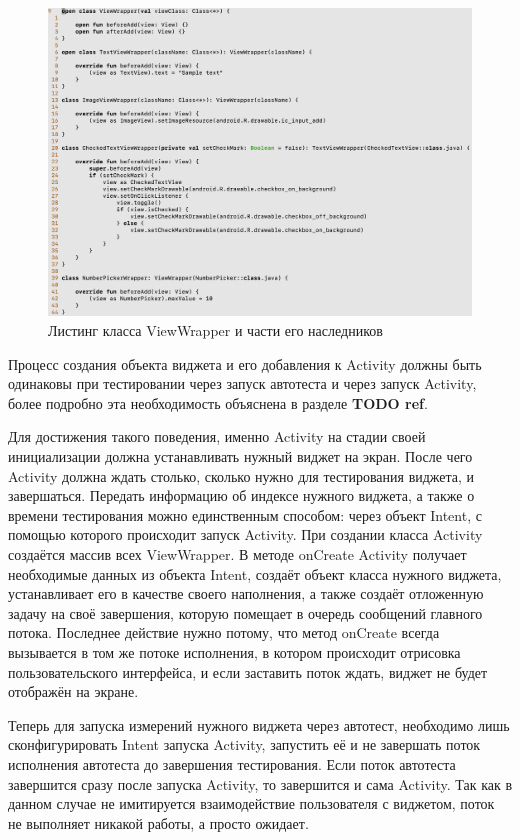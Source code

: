 \documentclass[a4paper,14pt]{extarticle} %
\begin{document}
	\begin{figure}[tbh]
		\includegraphics[width=\textwidth]{wrapper}
		\caption{Листинг класса ViewWrapper и части его наследников}
		\label{fig:wrapper}
	\end{figure}

	Процесс создания объекта виджета и его добавления к Activity должны быть одинаковы при тестировании через запуск автотеста и через запуск Activity, более подробно эта необходимость объяснена в разделе \textbf{TODO ref}.
	
	Для достижения такого поведения, именно Activity на стадии своей инициализации должна устанавливать нужный виджет на экран. После чего Activity должна ждать столько, сколько нужно для тестирования виджета, и завершаться. Передать информацию об индексе нужного виджета, а также о времени тестирования можно единственным способом: через объект Intent, с помощью которого происходит запуск Activity. При создании класса Activity создаётся массив всех ViewWrapper. В методе onCreate Activity получает необходимые данных из объекта Intent, создаёт объект класса нужного виджета, устанавливает его в качестве своего наполнения, а также создаёт отложенную задачу на своё завершения, которую помещает в очередь сообщений главного потока. Последнее действие нужно потому, что метод onCreate всегда вызывается в том же потоке исполнения, в котором происходит отрисовка пользовательского интерфейса, и если заставить поток ждать, виджет не будет отображён на экране.
	
	Теперь для запуска измерений нужного виджета через автотест, необходимо лишь сконфигурировать Intent запуска Activity, запустить её и не завершать поток исполнения автотеста до завершения тестирования. Если поток автотеста завершится сразу после запуска Activity, то завершится и сама Activity. Так как в данном случае не имитируется взаимодействие пользователя с виджетом, поток не выполняет никакой работы, а просто ожидает.
	
\end{document}
